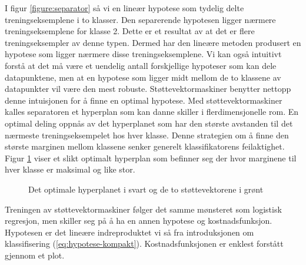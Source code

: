 I figur \ref{figure:separator} så vi en lineær hypotese som tydelig delte treningseksemplene i to klasser. Den separerende hypotesen ligger nærmere treningseksemplene for klasse 2. Dette er et resultat av at det er flere treningseksempler av denne typen. Dermed har den lineære metoden produsert en hypotese som ligger nærmere disse treningseksemplene. Vi kan også intuitivt forstå at det må være et uendelig antall forskjellige hypoteser som kan dele datapunktene, men at en hypotese som ligger midt mellom de to klassene av datapunkter vil være den mest robuste. Støttevektormaskiner benytter nettopp denne intuisjonen for å finne en optimal hypotese. Med støttevektormaskiner kalles separatoren et hyperplan som kan danne skiller i flerdimensjonelle rom. En optimal deling oppnås av det hyperplanet som har den største avstanden til det nærmeste treningseksempelet hos hver klasse. Denne strategien om å finne den største marginen mellom klassene senker generelt klassifikatorens feilaktighet. Figur \ref{figure:svm} viser et slikt optimalt hyperplan som befinner seg der hvor marginene til hver klasse er maksimal og like stor.
\begin{figure}[h!]
\centering
{}
\caption{Det optimale hyperplanet i svart og de to støttevektorene i grønt}
\label{figure:svm}
\end{figure}
Treningen av støttevektormaskiner følger det samme mønsteret som logistisk regresjon, men skiller seg på å ha en annen hypotese og kostnadsfunksjon. Hypotesen er det lineære indreproduktet vi så fra introduksjonen om klassifisering (\ref{eq:hypotese-kompakt}). Kostnadsfunksjonen er enklest forstått gjennom et plot.
